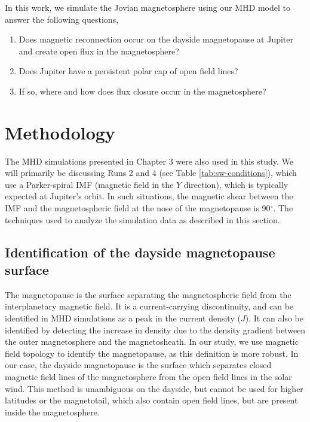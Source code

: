 In this work, we simulate the Jovian magnetosphere using our MHD model to answer the following questions,

\begin{enumerate}
    \item Does magnetic reconnection occur on the dayside magnetopause at Jupiter and create open flux in the magnetosphere?
    \item Does Jupiter have a persistent polar cap of open field lines? 
    \item If so, where and how does flux closure occur in the magnetosphere?
\end{enumerate}

\section{Methodology}
The MHD simulations presented in Chapter 3 were also used in this study. We will primarily be discussing Runs 2 and 4 (see Table \ref{tab:sw-conditions}), which use a Parker-spiral IMF (magnetic field in the $Y$ direction), which is typically expected at Jupiter's orbit. In such situations, the magnetic shear between the IMF and the magnetospheric field at the nose of the magnetopause is 90$^\circ$. The techniques used to analyze the simulation data as described in this section.

\subsection{Identification of the dayside magnetopause surface}
The magnetopause is the surface separating the magnetospheric field from the interplanetary magnetic field. It is a current-carrying discontinuity, and can be identified in MHD simulations as a peak in the current density ($J$). It can also be identified by detecting the increase in density due to the density gradient between the outer magnetosphere and the magnetosheath. In our study, we use magnetic field topology to identify the magnetopause, as this definition is more robust. In our case, the dayside magnetopause is the surface which separates closed magnetic field lines of the magnetosphere from the open field lines in the solar wind. This method is unambiguous on the dayside, but cannot be used for higher latitudes or the magnetotail, which also contain open field lines, but are present inside the magnetosphere. 

